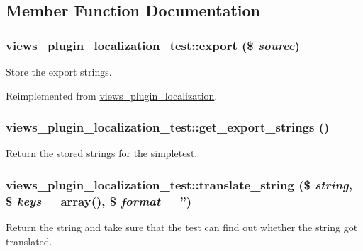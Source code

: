 \subsection{Member Function Documentation}
\hypertarget{classviews__plugin__localization__test_a1740df329ba25cb81db1cf1a92be9ed8}{
\subsubsection[{export}]{\setlength{\rightskip}{0pt plus 5cm}views\_\-plugin\_\-localization\_\-test::export (\$ {\em source})}}
\label{classviews__plugin__localization__test_a1740df329ba25cb81db1cf1a92be9ed8}
Store the export strings. 

Reimplemented from \hyperlink{classviews__plugin__localization_a68c74a8cc99b0b52046064eac84cb07f}{views\_\-plugin\_\-localization}.\hypertarget{classviews__plugin__localization__test_ae6645d5f7cd47349668c3bf504914407}{
\subsubsection[{get\_\-export\_\-strings}]{\setlength{\rightskip}{0pt plus 5cm}views\_\-plugin\_\-localization\_\-test::get\_\-export\_\-strings ()}}
\label{classviews__plugin__localization__test_ae6645d5f7cd47349668c3bf504914407}
Return the stored strings for the simpletest. \hypertarget{classviews__plugin__localization__test_a0b8d7823ac389e461a0cbe95488254d5}{
\subsubsection[{translate\_\-string}]{\setlength{\rightskip}{0pt plus 5cm}views\_\-plugin\_\-localization\_\-test::translate\_\-string (\$ {\em string}, \/  \$ {\em keys} = {\ttfamily array()}, \/  \$ {\em format} = {\ttfamily ''})}}
\label{classviews__plugin__localization__test_a0b8d7823ac389e461a0cbe95488254d5}
Return the string and take sure that the test can find out whether the string got translated. 

